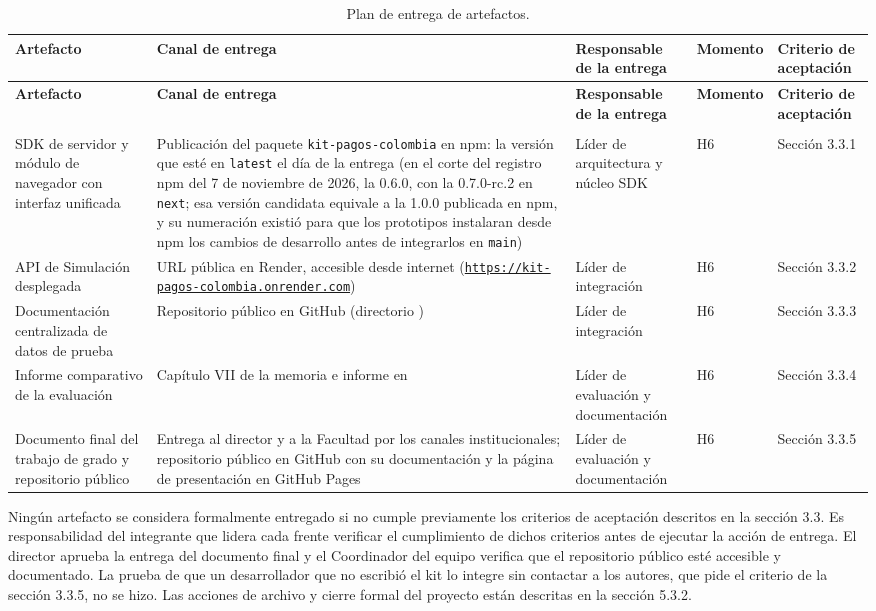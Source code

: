 \begin{center}
\renewcommand{\arraystretch}{1.2}
\begin{longtable}{|P{0.194}|P{0.192}|P{0.192}|P{0.192}|P{0.194}|}
  \hline
  \textbf{Artefacto} & \textbf{Canal de entrega} & \textbf{Responsable de la entrega} & \textbf{Momento} & \textbf{Criterio de aceptación} \\
  \hline
  \endfirsthead
  \hline
  \textbf{Artefacto} & \textbf{Canal de entrega} & \textbf{Responsable de la entrega} & \textbf{Momento} & \textbf{Criterio de aceptación} \\
  \hline
  \endhead
  \caption{Plan de entrega de artefactos.}
  \label{tab:entregables-producto}\\
  \endlastfoot
  SDK de servidor y módulo de navegador con interfaz unificada & Publicación del paquete \texttt{kit-pagos-\allowbreak colombia} en npm: la versión que esté en \texttt{latest} el día de la entrega (en el corte del registro npm del 7 de noviembre de 2026, la 0.6.0, con la 0.7.0-rc.2 en \texttt{next}; esa versión candidata equivale a la 1.0.0 publicada en npm, y su numeración existió para que los prototipos instalaran desde npm los cambios de desarrollo antes de integrarlos en \texttt{main}) & Líder de arquitectura y núcleo SDK & H6 & Sección 3.3.1 \\
  \hline
  API de Simulación desplegada & URL pública en Render, accesible desde internet (\href{https://kit-pagos-colombia.onrender.com}{\texttt{https://\allowbreak kit-pagos-\allowbreak colombia.\allowbreak onrender.com}}) & Líder de integración & H6 & Sección 3.3.2 \\
  \hline
  Documentación centralizada de datos de prueba & Repositorio público en GitHub (directorio ) & Líder de integración & H6 & Sección 3.3.3 \\
  \hline
  Informe comparativo de la evaluación & Capítulo VII de la memoria e informe en  & Líder de evaluación y documentación & H6 & Sección 3.3.4 \\
  \hline
  Documento final del trabajo de grado y repositorio público & Entrega al director y a la Facultad por los canales institucionales; repositorio público en GitHub con su documentación y la página de presentación en GitHub Pages & Líder de evaluación y documentación & H6 & Sección 3.3.5 \\
  \hline
\end{longtable}
\end{center}

Ningún artefacto se considera formalmente entregado si no cumple previamente los criterios de aceptación descritos en la sección 3.3. Es responsabilidad del integrante que lidera cada frente verificar el cumplimiento de dichos criterios antes de ejecutar la acción de entrega. El director aprueba la entrega del documento final y el Coordinador del equipo verifica que el repositorio público esté accesible y documentado. La prueba de que un desarrollador que no escribió el kit lo integre sin contactar a los autores, que pide el criterio de la sección 3.3.5, no se hizo. Las acciones de archivo y cierre formal del proyecto están descritas en la sección 5.3.2.
